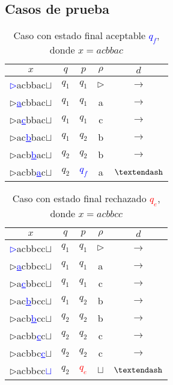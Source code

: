\documentclass[letterpaper,11pt]{article}
\begin{document}
\subsection{Casos de prueba}

\begin{table}[h!]
\centering
\begin{tabular}{c|c|c|c|c}
\hline
$x$ & $q$ & $p$ & $\rho$ & $d$ \\ \hline
\textcolor{blue}{\underline{$\rhd$}}acbbac$\sqcup$  & $q_1$ & $q_1$ & $\rhd$ & $\rightarrow$  \\
$\rhd$\textcolor{blue}{\underline{a}}cbbac$\sqcup$  & $q_1$ & $q_1$ & a & $\rightarrow$  \\
$\rhd$a\textcolor{blue}{\underline{c}}bbac$\sqcup$  & $q_1$ & $q_1$ & c & $\rightarrow$  \\
$\rhd$ac\textcolor{blue}{\underline{b}}bac$\sqcup$  & $q_1$ & $q_2$ & b & $\rightarrow$  \\
$\rhd$acb\textcolor{blue}{\underline{b}}ac$\sqcup$  & $q_2$ & $q_2$ & b & $\rightarrow$  \\
$\rhd$acbb\textcolor{blue}{\underline{a}}c$\sqcup$  & $q_2$ & \textcolor{blue}{$q_f$} & a & $\textendash$  \\\hline
\end{tabular}
\caption{Caso con estado final aceptable \textcolor{blue}{$q_f$}, donde $x=acbbac$}
\end{table}

\begin{table}[h!]
\centering
\begin{tabular}{c|c|c|c|c}
\hline
$x$ & $q$ & $p$ & $\rho$ & $d$ \\ \hline
\textcolor{blue}{\underline{$\rhd$}}acbbcc$\sqcup$  & $q_1$ & $q_1$ & $\rhd$ & $\rightarrow$  \\
$\rhd$\textcolor{blue}{\underline{a}}cbbcc$\sqcup$  & $q_1$ & $q_1$ & a & $\rightarrow$  \\
$\rhd$a\textcolor{blue}{\underline{c}}bbcc$\sqcup$  & $q_1$ & $q_1$ & c & $\rightarrow$  \\
$\rhd$ac\textcolor{blue}{\underline{b}}bcc$\sqcup$  & $q_1$ & $q_2$ & b & $\rightarrow$  \\
$\rhd$acb\textcolor{blue}{\underline{b}}cc$\sqcup$  & $q_2$ & $q_2$ & b & $\rightarrow$  \\
$\rhd$acbb\textcolor{blue}{\underline{c}}c$\sqcup$  & $q_2$ & $q_2$ & c & $\rightarrow$  \\
$\rhd$acbbc\textcolor{blue}{\underline{c}}$\sqcup$  & $q_2$ & $q_2$ & c & $\rightarrow$  \\
$\rhd$acbbcc\textcolor{blue}{\underline{$\sqcup$}}  & $q_2$ & \textcolor{red}{$q_e$} & $\sqcup$ & $\textendash$  \\\hline
\end{tabular}
\caption{Caso con estado final rechazado \textcolor{red}{$q_e$}, donde $x=acbbcc$}
\end{table}
\end{document}
